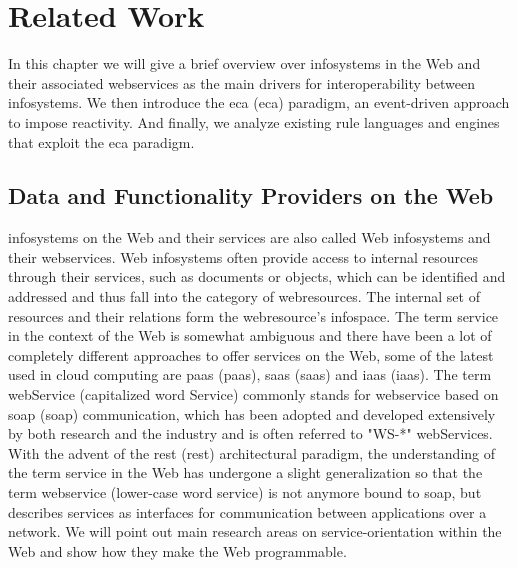 
\chapter{Related Work}

In this chapter we will give a brief overview over \textrm{\glspl{infosystem}} in the Web and their associated \textrm{\glspl{webservice}} as the main drivers for interoperability between \textrm{\glspl{infosystem}}.
We then introduce the \textrm{\acrlong{eca} (\acrshort{eca})} paradigm, an event-driven approach to impose reactivity.
And finally, we analyze existing rule languages and engines that exploit the \textrm{\acrshort{eca}} paradigm.



\section{Data and Functionality Providers on the Web}
\textrm{\glspl{infosystem}} on the Web and their services are also called \textrm{Web \glspl{infosystem}} and their \textrm{\glspl{webservice}}.
\textrm{Web \glspl{infosystem}} often provide access to internal resources through their services, such as documents or objects, which can be identified and addressed and thus fall into the category of \textrm{\glspl{webresource}}.
The internal set of resources and their relations form the \textrm{\gls{webresource}}'s \textrm{\gls{infospace}}\cite{newby1996metric}.
The term service in the context of the Web is somewhat ambiguous and there have been a lot of completely different approaches to offer services on the Web, some of the latest used in cloud computing are \textrm{\acrlong{paas} (\acrshort{paas})}, \textrm{\acrlong{saas} (\acrshort{saas})} and \textrm{\acrlong{iaas} (\acrshort{iaas})}.
The term \textrm{\gls{webService}} (capitalized word \textrm{Service}) commonly stands for \textrm{\gls{webservice}} based on \textrm{\acrlong{soap} (\acrshort{soap})} communication\cite{journals/itpro/BarrosD06}, which has been adopted and developed extensively by both research and the industry and is often referred to "WS-*" \textrm{\glspl{webService}}.
With the advent of the \textrm{\acrlong{rest} (\acrshort{rest})} architectural paradigm, the understanding of the term service in the Web has undergone a slight generalization so that the term \textrm{\gls{webservice}} (lower-case word \textrm{service}) is not anymore bound to \textrm{\acrshort{soap}}, but describes services as interfaces for communication between applications over a network\cite{richardson2008restful}.
We will point out main research areas on service-orientation within the Web and show how they make the Web programmable.

